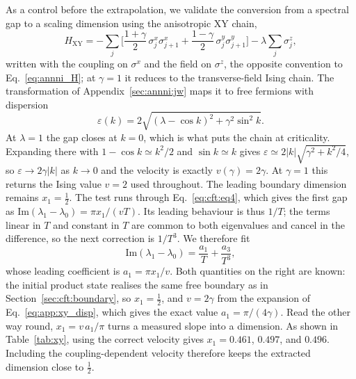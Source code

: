 As a control before the extrapolation, we validate the conversion from a spectral gap to a scaling dimension using the anisotropic XY chain,
\begin{equation}
  H_{\mathrm{XY}} = -\sum_j\Big[\frac{1+\gamma}{2}\,\sigma^x_j\sigma^x_{j+1}
    + \frac{1-\gamma}{2}\,\sigma^y_j\sigma^y_{j+1}\Big] - \lambda\sum_j\sigma^z_j,
  \label{eq:app:xy}
\end{equation}
written with the coupling on $\sigma^x$ and the field on $\sigma^z$, the opposite convention to Eq.~\eqref{eq:annni_H}; at $\gamma=1$ it reduces to the transverse-field Ising chain. The transformation of Appendix~\ref{sec:annni:jw} maps it to free fermions with dispersion
\begin{equation}
  \varepsilon(k)=2\sqrt{(\lambda-\cos k)^2+\gamma^2\sin^2 k}.
  \label{eq:app:xy_disp}
\end{equation}
At $\lambda=1$ the gap closes at $k=0$, which is what puts the chain at criticality. Expanding there with $1-\cos k\simeq k^2/2$ and $\sin k\simeq k$ gives $\varepsilon\simeq2|k|\sqrt{\gamma^2+k^2/4}$, so $\varepsilon\to2\gamma|k|$ as $k\to0$ and the velocity is exactly $v(\gamma)=2\gamma$. At $\gamma=1$ this returns the Ising value $v=2$ used throughout. The leading boundary dimension remains $x_1=\tfrac12$. The test runs through Eq.~\eqref{eq:cft:eq4}, which gives the first gap as $\mathrm{Im}(\lambda_1-\lambda_0)=\pi x_1/(vT)$. Its leading behaviour is thus $1/T$; the terms linear in $T$ and constant in $T$ are common to both eigenvalues and cancel in the difference, so the next correction is $1/T^3$. We therefore fit
\begin{equation}
  \mathrm{Im}(\lambda_1-\lambda_0)=\frac{a_1}{T}+\frac{a_3}{T^3},
  \label{eq:app:xy_fit}
\end{equation}
whose leading coefficient is $a_1=\pi x_1/v$. Both quantities on the right are known: the initial product state realises the same free boundary as in Section~\ref{sec:cft:boundary}, so $x_1=\tfrac12$, and $v=2\gamma$ from the expansion of Eq.~\eqref{eq:app:xy_disp}, which gives the exact value $a_1=\pi/(4\gamma)$. Read the other way round, $x_1=v\,a_1/\pi$ turns a measured slope into a dimension. As shown in Table~\ref{tab:xy}, using the correct velocity gives $x_1=0.461$, $0.497$, and $0.496$. Including the coupling-dependent velocity therefore keeps the extracted dimension close to $\tfrac12$.

